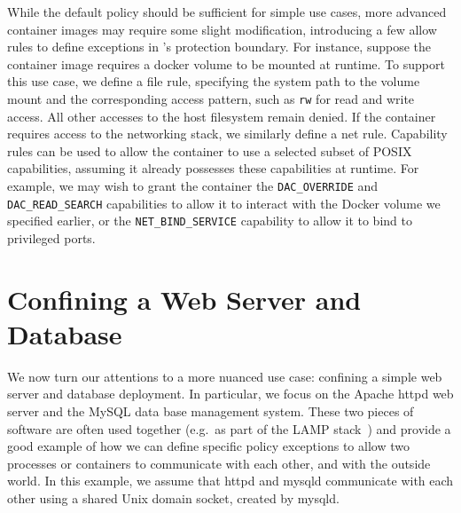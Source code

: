 While the \bpfcontain{} default policy should be sufficient for simple use cases, more
advanced container images may require some slight modification, introducing a few allow
rules to define exceptions in \bpfcontain{}'s protection boundary. For instance, suppose
the container image requires a docker volume to be mounted at runtime. To support this use
case, we define a file rule, specifying the system path to the volume mount and the
corresponding access pattern, such as \texttt{rw} for read and write access. All other
accesses to the host filesystem remain denied. If the container requires access to the
networking stack, we similarly define a net rule.  Capability rules can be used to allow
the container to use a selected subset of POSIX capabilities, assuming it already
possesses these capabilities at runtime. For example, we may wish to grant the container
the \texttt{DAC\_OVERRIDE} and \texttt{DAC\_READ\_SEARCH} capabilities to allow it to
interact with the Docker volume we specified earlier, or the \texttt{NET\_BIND\_SERVICE}
capability to allow it to bind to privileged ports.


\section{Confining a Web Server and Database}

We now turn our attentions to a more nuanced use case: confining a simple web server and
database deployment. In particular, we focus on the Apache httpd web server and the MySQL
data base management system. These two pieces of software are often used together (e.g.~as
part of the LAMP stack~) and provide a good example of how we can define
specific policy exceptions to allow two processes or containers to communicate with each
other, and with the outside world. In this example, we assume that httpd and mysqld
communicate with each other using a shared Unix domain socket, created by mysqld.

